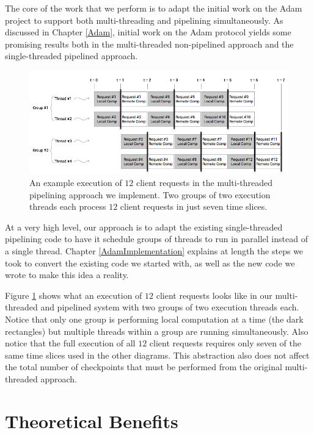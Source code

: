 \documentclass[11pt, oneside]{report}
\begin{document}
The core of the work that we perform is to adapt the initial work on the Adam project to support both multi-threading and pipelining simultaneously.
As discussed in Chapter \ref{Adam}, initial work on the Adam protocol yields some promising results both in the multi-threaded non-pipelined approach and the single-threaded pipelined approach. 

\begin{figure}[h]
\centering
\includegraphics[width=1.0\textwidth]{PipelinedParallel.png}
\caption{\label{parpipe}An example execution of $12$ client requests in the multi-threaded pipelining approach we implement. Two groups of two execution threads each process $12$ client requests in just seven time slices.}
\end{figure}

At a very high level, our approach is to adapt the existing single-threaded pipelining code to have it schedule groups of threads to run in parallel instead of a single thread.
Chapter \ref{AdamImplementation} explains at length the steps we took to convert the existing code we started with, as well as the new code we wrote to make this idea a reality.

Figure \ref{parpipe} shows what an execution of $12$ client requests looks like in our multi-threaded and pipelined system with two groups of two execution threads each. 
Notice that only one group is performing local computation at a time (the dark rectangles) but multiple threads within a group are running simultaneously.
Also notice that the full execution of all $12$ client requests requires only seven of the same time slices used in the other diagrams.
This abstraction also does not affect the total number of checkpoints that must be performed from the original multi-threaded approach.

\section{Theoretical Benefits}
\end{document}
